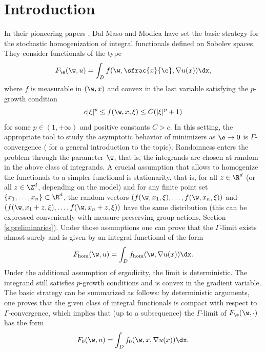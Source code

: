 \section{Introduction}
In their pioneering papers \cite{DMMoI,DMMoII}, Dal Maso and Modica have set the basic strategy for the stochastic homogenization of integral functionals defined on Sobolev spaces. They consider functionals of the type
\begin{equation}\label{eq:F_eps}
F_{\e}(\w,u)=\int_D f(\w,\sfrac{x}{\e},\nabla u(x))\dx,
\end{equation}
where $f$ is measurable in $(\w,x)$ and convex in the last variable satisfying the $p$-growth condition
\begin{equation}\label{eq:p-growth}
c|\xi|^p\leq f(\w,x,\xi)\leq C(|\xi|^p+1)
\end{equation}
for some $p\in (1,+\infty)$ and positive constants $C>c$. In this setting, the appropriate tool to study the asymptotic behavior of minimizers as $\e\to 0$ is $\Gamma$-convergence (\cf \cite{Br,DM} for a general introduction to the topic). Randomness enters the problem through the parameter $\w$, that is, the integrands are chosen at random in the above class of integrands. A crucial assumption that allows to homogenize the functionals to a simpler functional is stationarity, that is, for all $z\in\R^d$ (or all $z\in\Z^d$, depending on the model) and for any finite point set $\{x_1,\ldots,x_n\}\subset\R^d$, the random vectors $(f(\w,x_1,\xi),\ldots,f(\w,x_n,\xi))$ and $(f(\w,x_1+z,\xi),\ldots,f(\w,x_n+z,\xi))$ have the same distribution (this can be expressed conveniently with measure preserving group actions, \cf Section \ref{s.preliminaries}). Under those assumptions one can prove that the $\Gamma$-limit exists almost surely and is given by an integral functional of the form
\begin{equation*}
F_{\hom}(\w,u)=\int_D f_{\hom}(\w,\nabla u(x))\dx.
\end{equation*}
Under the additional assumption of ergodicity, the limit is deterministic. The integrand still satisfies $p$-growth conditions and is convex in the gradient variable. The basic strategy can be summarized as follows: by deterministic arguments, one proves that the given class of integral functionals is compact with respect to $\Gamma$-convergence, which implies that (up to a subsequence) the $\Gamma$-limit of $F_{\e}(\w,\cdot)$ has the form
\begin{equation*}
F_{0}(\w,u)=\int_D f_0(\w,x,\nabla u(x))\dx.
\end{equation*}

